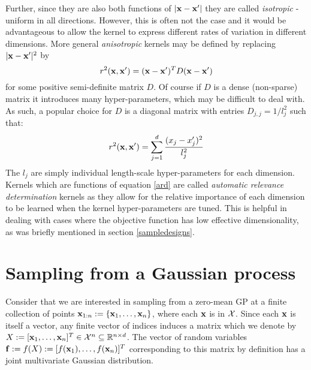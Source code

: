 Further, since they are also both functions of $\lvert \mathbf{x} - \mathbf{x}' \rvert$ they are called \textit{isotropic} - uniform in all directions. However, this is often not the case and it would be advantageous to allow the kernel to express different rates of variation in different dimensions. More general \textit{anisotropic} kernels may be defined by replacing $\lvert \mathbf{x} - \mathbf{x}' \rvert^2$ by
%
\begin{equation}
r^2(\mathbf{x}, \mathbf{x}') = (\mathbf{x} - \mathbf{x}')^T D (\mathbf{x} - \mathbf{x}')
\end{equation}
%
for some positive semi-definite matrix $D$. Of course if $D$ is a dense (non-sparse) matrix it introduces many hyper-parameters, which may be difficult to deal with. As such, a popular choice for $D$ is a diagonal matrix with entries $D_{j,j} = 1/l_j^2$ such that:
%
\begin{equation}
r^2(\mathbf{x}, \mathbf{x}') = \sum_{j=1}^{d} \frac{(x_j - x'_j)^2}{l_j^2} \label{ard}
\end{equation}
%
The $l_j$ are simply individual length-scale hyper-parameters for each dimension. Kernels which are functions of equation \ref{ard} are called \textit{automatic relevance determination} kernels \cite{neal1996bayesian} as they allow for the relative importance of each dimension to be learned when the kernel hyper-parameters are tuned. This is helpful in dealing with cases where the objective function has low effective dimensionality, as was briefly mentioned in section \ref{sampledesigns}.

\section{Sampling from a Gaussian process}

Consider that we are interested in sampling from a zero-mean GP at a finite collection of points $\mathbf{x}_{1:n} := \{\mathbf{x}_1, \ldots, \mathbf{x}_n\}$, where each $\mathbf{x}$ is in $\mathcal{X}$. Since each $\mathbf{x}$ is itself a vector, any finite vector of indices induces a matrix which we denote by $X := [\mathbf{x}_1, \ldots , \mathbf{x}_n]^T \in \mathcal{X}^n \subseteq \mathbb{R}^{n \times d}$. The vector of random variables $\mathbf{f} := f(X) := [f(\mathbf{x}_1), \ldots , f(\mathbf{x}_n)]^T$ corresponding to this matrix by definition has a joint multivariate Gaussian distribution.

